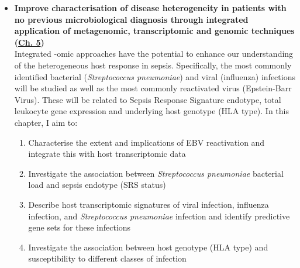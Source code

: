 \begin{itemize}[leftmargin=*]
\item	\textbf{Improve characterisation of disease heterogeneity in patients with no previous microbiological diagnosis through integrated application of metagenomic, transcriptomic and genomic techniques (\hyperref[ch:Results3]{Ch. 5})} \\
Integrated -omic approaches have the potential to enhance our understanding of the heterogeneous host response in sepsis. Specifically, the most commonly identified bacterial (\textit{Streptococcus pneumoniae}) and viral (influenza) infections will be studied as well as the most commonly reactivated virus (Epstein-Barr Virus). These will be related to Sepsis Response Signature endotype, total leukocyte gene expression and underlying host genotype (HLA type). In this chapter, I aim to:
		\begin{enumerate}
			\item Characterise the extent and implications of EBV reactivation and integrate this with host transcriptomic data
			\item Investigate the association between \textit{Streptococcus pneumoniae} bacterial load and sepsis endotype (SRS status)
			\item Describe host transcriptomic signatures of viral infection, influenza infection, and \textit{Streptococcus pneumoniae} infection and identify predictive gene sets for these infections
			\item Investigate the association between host genotype (HLA type) and susceptibility to different classes of infection
		\end{enumerate}

		
\end{itemize}







